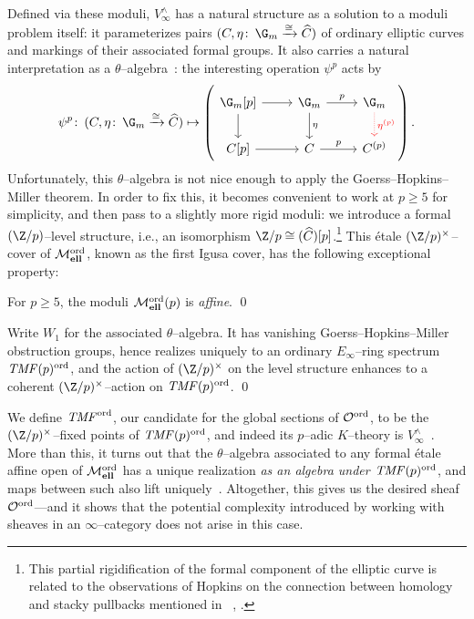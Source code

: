 \noindent Defined via these moduli, \(V^\wedge_\infty\) has a natural structure as a solution to a moduli problem itself: it parameterizes pairs \((C, \eta\co \G_m \xrightarrow{\cong} \widehat C)\) of ordinary elliptic curves and markings of their associated formal groups.  It also carries a natural interpretation as a \(\theta\)--algebra~\cite[Equation 5.3]{BehrensConstruction}: the interesting operation \(\psi^p\) acts by
\[
\psi^p\co (C, \eta\co \G_m \xrightarrow\cong \widehat C) \mapsto \left(
\begin{tikzcd}
\G_m[p] \arrow{r} \arrow{d} & \G_m \arrow["p"]{r} \arrow["\eta"]{d} & \G_m \arrow[densely dotted, red, "\eta^{(p)}"]{d} \\
C[p]\arrow{r} & C \arrow["p"]{r} & C^{(p)}
\end{tikzcd}
\right).
\]
Unfortunately, this \(\theta\)--algebra is not nice enough to apply the Goerss--Hopkins--Miller theorem.  In order to fix this, it becomes convenient to work at \(p \ge 5\) for simplicity, and then pass to a slightly more rigid moduli: we introduce a formal \((\Z/p)\)--level structure, i.e., an isomorphism \(\Z/p \cong (\widehat C)[p]\).\footnote{This partial rigidification of the formal component of the elliptic curve is related to the observations of Hopkins on the connection between homology and stacky pullbacks mentioned in ~\cite[Section 3.1]{HopkinsFromSpectraToStacks}, \cite[Section 12]{Rezk512Notes}.}  This \'etale \((\Z/p)^\times\)--cover of \(\mathcal{M}_{\mathbf{ell}}^{\mathrm{ord}}\), known as the first Igusa cover, has the following exceptional property:

\begin{lemma}
For \(p \ge 5\), the moduli \(\mathcal{M}_{\mathbf{ell}}^{\mathrm{ord}}(p)\) is \emph{affine}. \qed
\end{lemma}

\begin{corollary}
Write \(W_1\) for the associated \(\theta\)--algebra.  It has vanishing Goerss--Hopkins--Miller obstruction groups, hence realizes uniquely to an ordinary \(E_\infty\)--ring spectrum \(\mathit{TMF}(p)^{\mathrm{ord}}\), and the action of \((\Z/p)^\times\) on the level structure enhances to a coherent \((\Z/p)^\times\)--action on \(\mathit{TMF}(p)^{\mathrm{ord}}\). \qed
\end{corollary}

We define \(\mathit{TMF}^{\mathrm{ord}}\), our candidate for the global sections of \(\mathcal{O}^{\mathrm{ord}}\), to be the \((\Z/p)^\times\)--fixed points of \(\mathit{TMF}(p)^{\mathrm{ord}}\), and indeed its \(p\)--adic \(K\)--theory is \(V^\wedge_\infty\)~\cite[Lemma 7.9]{BehrensConstruction}.  More than this, it turns out that the \(\theta\)--algebra associated to any formal \'etale affine open of \(\mathcal{M}_{\mathbf{ell}}^{\mathrm{ord}}\) has a unique realization \emph{as an algebra under \(\mathit{TMF}(p)^{\mathrm{ord}}\)}, and maps between such also lift uniquely~\cite[Section 7, Step 2]{BehrensConstruction}.  Altogether, this gives us the desired sheaf \(\mathcal{O}^{\mathrm{ord}}\)---and it shows that the potential complexity introduced by working with sheaves in an \(\infty\)--category does not arise in this case.

